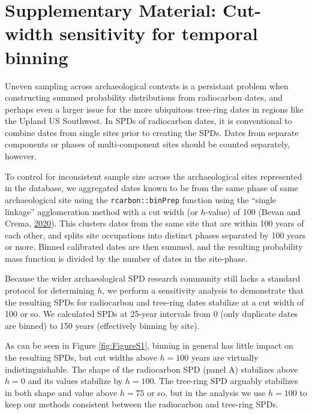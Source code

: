 \documentclass[
]{article}
\begin{document}
\hypertarget{supplementary-material-cut-width-sensitivity-for-temporal-binning}{%
\section*{Supplementary Material: Cut-width sensitivity for temporal binning}\label{supplementary-material-cut-width-sensitivity-for-temporal-binning}}

Uneven sampling across archaeological contexts is a persistant problem when constructing summed probability distributions from radiocarbon dates, and perhaps even a larger issue for the more ubiquitous tree-ring dates in regions like the Upland US Southwest. In SPDs of radiocarbon dates, it is conventional to combine dates from single sites prior to creating the SPDs. Dates from separate components or phases of multi-component sites should be counted separately, however.

To control for inconsistent sample size across the archaeological sites represented in the database, we aggregated dates known to be from the same phase of same archaeological site using the \texttt{rcarbon::binPrep} function using the ``single linkage'' agglomeration method with a cut width (or \(h\)-value) of 100 (Bevan and Crema, \protect\hyperlink{ref-rcarbon}{2020}). This clusters dates from the same site that are within 100 years of each other, and splits site occupations into distinct phases separated by 100 years or more. Binned calibrated dates are then summed, and the resulting probability mass function is divided by the number of dates in the site-phase.

Because the wider archaeological SPD research community still lacks a standard protocol for determining \(h\), we perform a sensitivity analysis to demonstrate that the resulting SPDs for radiocarbon and tree-ring dates stabilize at a cut width of 100 or so. We calculated SPDs at 25-year intervals from 0 (only duplicate dates are binned) to 150 years (effectively binning by site).

As can be seen in Figure \ref{fig:FigureS1}, binning in general has little impact on the resulting SPDs, but cut widths above \(h=100\) years are virtually indistinguishable. The shape of the radiocarbon SPD (panel A) stabilizes above \(h=0\) and its values stabilize by \(h=100\). The tree-ring SPD arguably stabilizes in both shape and value above \(h=75\) or so, but in the analysis we use \(h=100\) to keep our methods consistent between the radiocarbon and tree-ring SPDs.
\end{document}
